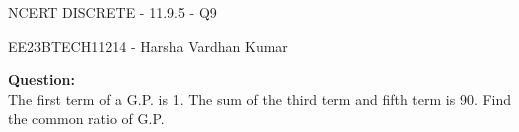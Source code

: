 \documentclass{article}
\begin{document}
\vspace{3cm}
\begin{center}
  \Huge{NCERT DISCRETE - 11.9.5 - Q9}
\end{center}
\begin{center}
    \Large {EE23BTECH11214 - Harsha Vardhan Kumar}
\end{center}
\bigskip
\begin{paracol}{2}
\begin{leftcolumn}
\noindent
\noindent\textbf{Question:}
\\
The first term of a G.P. is 1. The sum of the third term and fifth term is 90.
Find the common ratio of G.P.
\end{leftcolumn}
\end{paracol}
\end{document}
